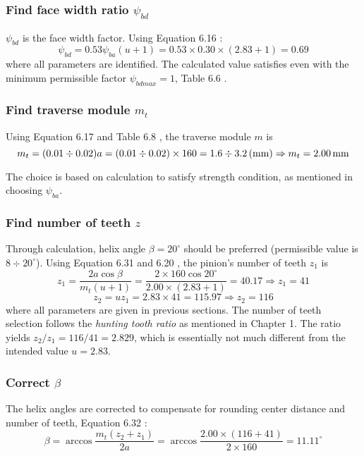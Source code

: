 \subsubsection{Find face width ratio $ \psi_{bd} $}
$ \psi_{bd} $ is the face width factor. Using Equation 6.16 \cite{tk1}:
\[ \psi_{bd} = 0.53\psi_{ba}(u+1) = 0.53\times 0.30\times(2.83+1) = 0.69 \]
where all parameters are identified. The calculated value satisfies even with the minimum permissible factor  $ \psi_{bdmax} = 1 $, Table 6.6 \cite{tk1}.
%
\subsubsection{Find traverse module $ m_t $}
Using Equation 6.17 and Table 6.8 \cite{tk1}, the traverse module $ m $ is
\[ m_t = (0.01\div0.02)a = (0.01\div0.02)\times 160 =  1.6 \div 3.2 \, (\mathrm{mm}) \Rightarrow m_t=2.00\, \mathrm{mm}\]

The choice is based on calculation to satisfy strength condition, as mentioned in choosing $ \psi_{ba} $.
\subsubsection{Find number of teeth $ z $}
Through calculation, helix angle $ \beta = 20^\circ $ should be preferred (permissible value is $ 8 \div 20^\circ $). Using Equation 6.31 and 6.20 \cite{tk1}, the pinion's number of teeth $ z_1 $ is
\[ z_1 = \dfrac{2a\cos\beta}{m_t(u+1)}= \dfrac{2\times 160\cos 20^\circ}{2.00\times(2.83+1)} = 40.17 \Rightarrow z_1 = 41\]
\[ z_2 = uz_1 = 2.83\times 41 = 115.97 \Rightarrow z_2 = 116\]
where all parameters are given in previous sections. The number of teeth selection follows the \textit{hunting tooth ratio} \cite{Ishibashi1981} as mentioned in Chapter 1. The ratio yields $ z_2/z_1=116/41=2.829 $, which is essentially not much different from the intended value $ u =2.83$. 

\subsubsection{Correct $ \beta $} The helix angles are corrected to compensate for rounding center distance and number of teeth, Equation 6.32 \cite{tk1}:
\[\beta = \arccos\dfrac{m_t(z_2+z_1)}{2a} = \arccos\dfrac{2.00\times(116+41)}{2\times 160} = 11.11 ^\circ\]

